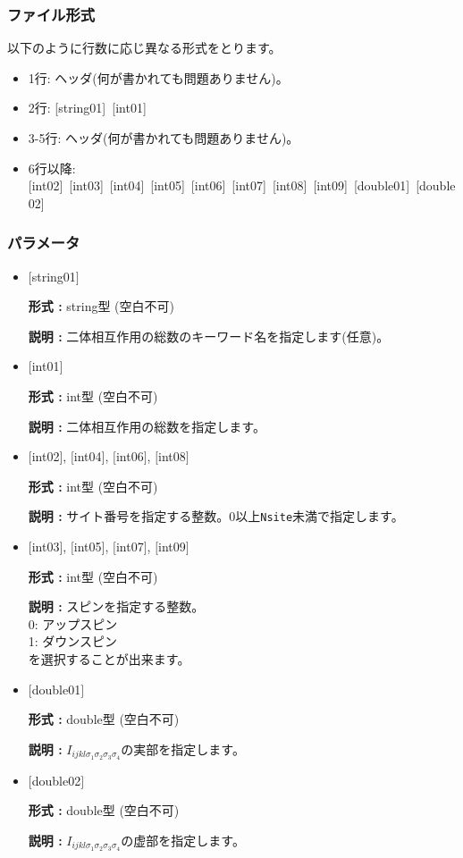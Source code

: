 \subsubsection{ファイル形式}
以下のように行数に応じ異なる形式をとります。
 \begin{itemize}
   \item  1行:  ヘッダ(何が書かれても問題ありません)。
   \item  2行:   [string01]~[int01]
   \item  3-5行:  ヘッダ(何が書かれても問題ありません)。
   \item  6行以降:
   [int02]~[int03]~[int04]~[int05]~[int06]~[int07]~[int08]~[int09]~[double01]~[double02] 
  \end{itemize}
\subsubsection{パラメータ}
 \begin{itemize}

   \item  $[$string01$]$
   
    {\bf 形式 :} string型 (空白不可)

   {\bf 説明 :} 二体相互作用の総数のキーワード名を指定します(任意)。

   \item  $[$int01$]$
   
    {\bf 形式 :} int型 (空白不可)

   {\bf 説明 :} 二体相互作用の総数を指定します。

  \item  $[$int02$]$, $[$int04$]$, $[$int06$]$, $[$int08$]$

 {\bf 形式 :} int型 (空白不可)

{\bf 説明 :} サイト番号を指定する整数。0以上\verb|Nsite|{未満}で指定します。
 
  \item  $[$int03$]$, $[$int05$]$, $[$int07$]$, $[$int09$]$

 {\bf 形式 :} int型 (空白不可)

{\bf 説明 :} スピンを指定する整数。\\
0: アップスピン\\
1: ダウンスピン\\
を選択することが出来ます。


 \item  $[$double01$]$
   
   {\bf 形式 :} double型 (空白不可)

  {\bf 説明 :}  $I_{ijkl\sigma_1\sigma_2\sigma_3\sigma_4}$の実部を指定します。

 \item  $[$double02$]$
   
   {\bf 形式 :} double型 (空白不可)

  {\bf 説明 :}  $I_{ijkl\sigma_1\sigma_2\sigma_3\sigma_4}$の虚部を指定します。
\end{itemize}


